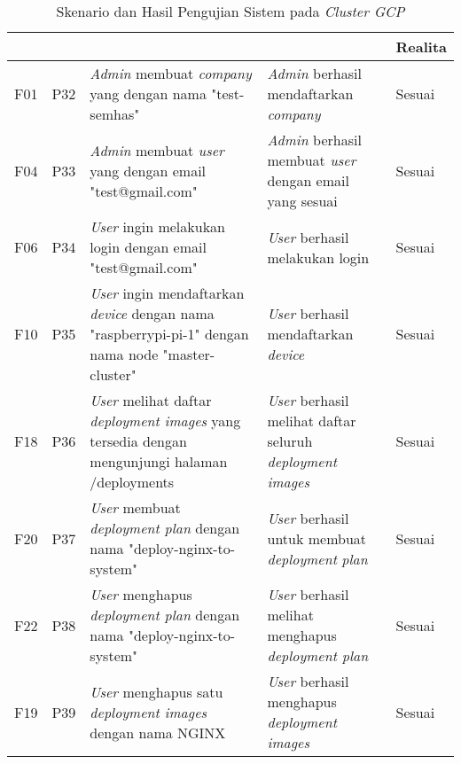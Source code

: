 \bgroup
\begin{table}[ht]
  \def\arraystretch{1.3}
  \caption{Skenario dan Hasil Pengujian Sistem pada \textit{Cluster GCP}}
  \label{tab:pengujian-sistem-gcp}
  \centering
  \begin{tabular}{|p{2cm}|p{2cm}|p{3cm}|p{3cm}|p{1.5cm}|}
    \hline
    \centering{ID Fungsional} & \centering{ID Pengujian} & \centering{Skenario}                                                                                              & \centering{Ekspektasi}                                                   & Realita \\
    \hline
    F01                       & P32                      & \textit{Admin} membuat \textit{company} yang dengan nama "test-semhas"                                            & \textit{Admin} berhasil mendaftarkan \textit{company}                    & Sesuai  \\
    \hline
    F04                       & P33                      & \textit{Admin} membuat \textit{user} yang dengan email  "test@gmail.com"                                          & \textit{Admin} berhasil membuat \textit{user} dengan email yang sesuai   & Sesuai  \\
    \hline
    F06                       & P34                      & \textit{User} ingin melakukan login dengan email  "test@gmail.com"                                                & \textit{User} berhasil melakukan login                                   & Sesuai  \\
    \hline
    F10                       & P35                      & \textit{User} ingin mendaftarkan \textit{device} dengan nama "raspberrypi-pi-1" dengan nama node "master-cluster" & \textit{User} berhasil mendaftarkan \textit{device}                      & Sesuai  \\
    \hline
    F18                       & P36                      & \textit{User} melihat daftar  \textit{deployment images} yang tersedia dengan mengunjungi halaman /deployments    & \textit{User} berhasil melihat daftar seluruh \textit{deployment images} & Sesuai  \\
    \hline
    F20                       & P37                      & \textit{User} membuat \textit{deployment plan} dengan nama "deploy-nginx-to-system"                               & \textit{User} berhasil untuk membuat \textit{deployment} \textit{plan}   & Sesuai  \\
    \hline
    F22                       & P38                      & \textit{User} menghapus \textit{deployment plan} dengan nama "deploy-nginx-to-system"                             & \textit{User} berhasil melihat menghapus \textit{deployment plan}        & Sesuai  \\
    \hline
    F19                       & P39                      & \textit{User} menghapus satu \textit{deployment images} dengan nama NGINX                                         & \textit{User} berhasil menghapus \textit{deployment images}              & Sesuai  \\
    \hline
  \end{tabular}
\end{table}
\egroup